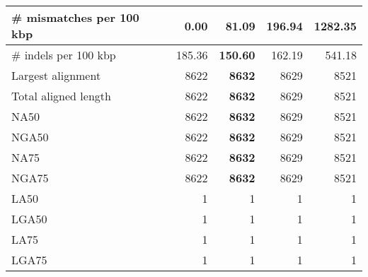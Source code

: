 \documentclass[12pt,a4paper]{article}
\begin{document}
\begin{table}[ht]
\begin{center}
\begin{tabular}{|l*{4}{|r}|}
\# mismatches per 100 kbp & {\bf 0.00} & 81.09 & 196.94 & 1282.35 \\ \hline
\# indels per 100 kbp & 185.36 & {\bf 150.60} & 162.19 & 541.18 \\ \hline
Largest alignment & 8622 & {\bf 8632} & 8629 & 8521 \\ \hline
Total aligned length & 8622 & {\bf 8632} & 8629 & 8521 \\ \hline
NA50 & 8622 & {\bf 8632} & 8629 & 8521 \\ \hline
NGA50 & 8622 & {\bf 8632} & 8629 & 8521 \\ \hline
NA75 & 8622 & {\bf 8632} & 8629 & 8521 \\ \hline
NGA75 & 8622 & {\bf 8632} & 8629 & 8521 \\ \hline
LA50 & 1 & 1 & 1 & 1 \\ \hline
LGA50 & 1 & 1 & 1 & 1 \\ \hline
LA75 & 1 & 1 & 1 & 1 \\ \hline
LGA75 & 1 & 1 & 1 & 1 \\ \hline
\end{tabular}
\end{center}
\end{table}
\end{document}
